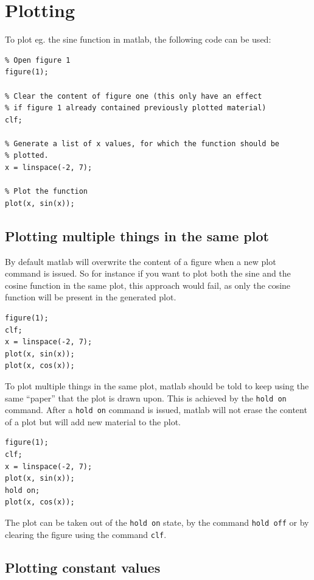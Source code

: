\section{Plotting}

To plot eg. the sine function in matlab, the following code
can be used:
\begin{lstlisting}
% Open figure 1
figure(1);

% Clear the content of figure one (this only have an effect 
% if figure 1 already contained previously plotted material)
clf;

% Generate a list of x values, for which the function should be 
% plotted.
x = linspace(-2, 7);

% Plot the function
plot(x, sin(x));
\end{lstlisting}

\subsection{Plotting multiple things in the same plot}

By default matlab will overwrite the content of a figure
when a new plot command is issued.
So for instance if you want to plot both the sine and the cosine 
function in the same plot, this approach would fail, as only the 
cosine function will be present in the generated plot.

\begin{lstlisting}
figure(1);
clf; 
x = linspace(-2, 7);
plot(x, sin(x));
plot(x, cos(x));
\end{lstlisting}

To plot multiple things in the same plot, matlab should be told
to keep using the same ``paper'' that the plot is drawn upon.
This is achieved by the \verb!hold on! command.
After a \verb!hold on! command is issued, matlab will not erase 
the content of a plot but will add new material to the plot.

\begin{lstlisting}
figure(1);
clf; 
x = linspace(-2, 7);
plot(x, sin(x));
hold on;
plot(x, cos(x));
\end{lstlisting}

The plot can be taken out of the \verb!hold on! state, by the 
command \verb!hold off! or by clearing the figure using the 
command \verb!clf!.


\subsection{Plotting constant values}

